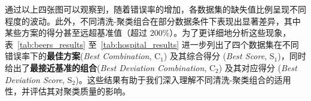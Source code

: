 \documentclass[10pt]{article} %
\numberwithin{equation}{section}
\begin{document}
\vspace{0.5em}
\noindent
通过以上四张图可以观察到，随着错误率的增加，各数据集的缺失值比例呈现不同程度的波动。此外，不同清洗-聚类组合在部分数据条件下表现出显著差异，其中某些方案的得分甚至远超基准值（超过 200\%）。为了更详细地分析这些现象，表~\ref{tab:beers_results} 至~\ref{tab:hospital_results} 进一步列出了四个数据集在不同错误率下的\textbf{最佳方案}(\textit{Best Combination}, C$_1$) 及其综合得分 (\textit{Best Score}, S$_1$)，同时给出了\textbf{最接近基准的组合}(\textit{Best Deviation Combination}, C$_2$) 及其对应得分 (\textit{Best Deviation Score}, S$_2$)。这些结果有助于我们深入理解不同清洗-聚类组合的适用性，并评估其对聚类质量的影响。

\begin{table}[htbp]
    \centering
    \small %
    \setlength{\tabcolsep}{4pt} %
    \renewcommand{\arraystretch}{1.1} %


\end{table}
\end{document}
